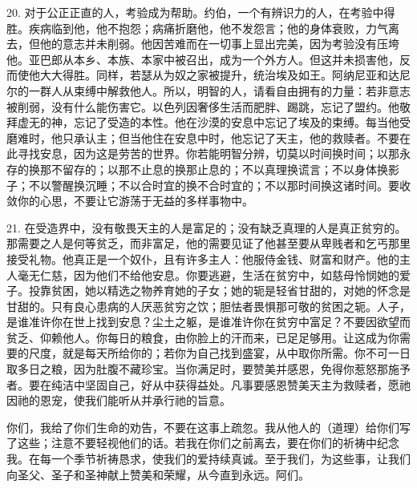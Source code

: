 20. 对于公正正直的人，考验成为帮助。约伯，一个有辨识力的人，在考验中得胜。疾病临到他，他不抱怨；病痛折磨他，他不发怨言；他的身体衰败，力气离去，但他的意志并未削弱。他因苦难而在一切事上显出完美，因为考验没有压垮他。亚巴郎从本乡、本族、本家中被召出，成为一个外方人。但这并未损害他，反而使他大大得胜。同样，若瑟从为奴之家被提升，统治埃及如王。阿纳尼亚和达尼尔的一群人从束缚中解救他人。所以，明智的人，请看自由拥有的力量：若非意志被削弱，没有什么能伤害它。以色列因奢侈生活而肥胖、踢跳，忘记了盟约。他敬拜虚无的神，忘记了受造的本性。他在沙漠的安息中忘记了埃及的束缚。每当他受磨难时，他只承认主；但当他住在安息中时，他忘记了天主，他的救赎者。不要在此寻找安息，因为这是劳苦的世界。你若能明智分辨，切莫以时间换时间；以那永存的换那不留存的；以那不止息的换那止息的；不以真理换谎言；不以身体换影子；不以警醒换沉睡；不以合时宜的换不合时宜的；不以那时间换这诸时间。要收敛你的心思，不要让它游荡于无益的多样事物中。\par

21. 在受造界中，没有敬畏天主的人是富足的；没有缺乏真理的人是真正贫穷的。那需要之人是何等贫乏，而非富足，他的需要见证了他甚至要从卑贱者和乞丐那里接受礼物。他真正是一个奴仆，且有许多主人：他服侍金钱、财富和财产。他的主人毫无仁慈，因为他们不给他安息。你要逃避，生活在贫穷中，如慈母怜悯她的爱子。投靠贫困，她以精选之物养育她的子女；她的轭是轻省甘甜的，对她的怀念是甘甜的。只有良心患病的人厌恶贫穷之饮；胆怯者畏惧那可敬的贫困之轭。人子，是谁准许你在世上找到安息？尘土之躯，是谁准许你在贫穷中富足？不要因欲望而贫乏、仰赖他人。你每日的粮食，由你脸上的汗而来，已足足够用。让这成为你需要的尺度，就是每天所给你的；若你为自己找到盛宴，从中取你所需。你不可一日取多日之粮，因为肚腹不藏珍宝。当你满足时，要赞美并感恩，免得你惹怒那施予者。要在纯洁中坚固自己，好从中获得益处。凡事要感恩赞美天主为救赎者，愿祂因祂的恩宠，使我们能听从并承行祂的旨意。\par

你们，我给了你们生命的劝告，不要在这事上疏忽。我从他人的（道理）给你们写了这些；注意不要轻视他们的话。若我在你们之前离去，要在你们的祈祷中纪念我。在每一个季节祈祷恳求，使我们的爱持续真诚。至于我们，为这些事，让我们向圣父、圣子和圣神献上赞美和荣耀，从今直到永远。阿们。\par

